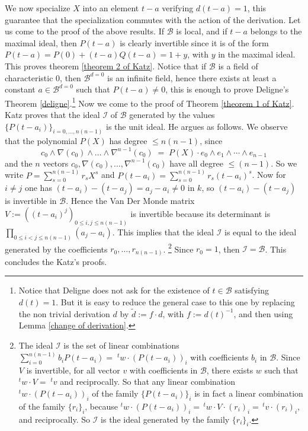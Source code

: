\documentclass{compositio}
\numberwithin{equation}{section}
\begin{document}
We now specialize $X$ into an element $t-a$ verifying $d(t-a)=1$, this guarantee that the 
specialization commutes with the action of the derivation. Let us come to the proof of the above results.
If ${\mathscr{B}}$ is local, and if $t-a$ belongs to the maximal ideal, 
then $P(t-a)$ is clearly invertible since it is of the form $P(t-a)=P(0)+(t-a)Q(t-a)=1+y$, 
with $y$ in the maximal ideal. 
\fi This proves theorem \ref{theorem 2 of Katz}. 
Notice that if ${\mathscr{B}}$ is a field of characteristic $0$, then ${\mathscr{B}}^{d=0}$ is an 
infinite field, hence there exists at least a constant $a\in{\mathscr{B}}^{d=0}$ such that $P(t-a)\neq 0$, 
this is enough to prove Deligne's Theorem \ref{deligne}.\footnote{Notice that Deligne does not ask for the existence of $t\in{\mathscr{B}}$ 
satisfying $d(t)=1$. But it is easy to reduce the general case to this one by replacing the non trivial 
derivation $d$ by $\widetilde{d}:=f\cdot d$, with $f:=d(t)^{-1}$, and then using Lemma \ref{change of derivation}.} 
Now we come to the proof of Theorem \ref{theorem 1 of Katz}. Katz proves that the ideal 
$\mathscr{I}$ 
of ${\mathscr{B}}$ generated by the values $\{P(t-a_i)\}_{i=0,\ldots,n(n-1)}$ is the unit ideal. He argues as follows. 
We observe that the polynomial $P(X)$ has degree $\leq n(n-1)$, since 
\begin{equation}
c_0\wedge\nabla(c_0)\wedge\ldots\wedge\nabla^{n-1}(c_0)\;=\;P(X)\cdot e_0\wedge e_1\wedge\cdots\wedge e_{n-1}
\end{equation}
and the $n$ vectors $c_0,\nabla(c_0),\ldots,\nabla^{n-1}(c_0)$ have all degree $\leq(n-1)$. So we write 
$P=\sum_{s=0}^{n(n-1)}r_sX^s$ and $P(t-a_i)=\sum_{s=0}^{n(n-1)}r_s(t-a_i)^s$. 
Now for $i\neq j$ one has $(t-a_i)-(t-a_j)=a_j-a_i\neq 0$ in $k$, 
so $(t-a_i)-(t-a_j)$ is invertible in ${\mathscr{B}}$. 
Hence the Van Der Monde matrix $V:=((t-a_i)^j)_{0\leq i,j\leq n(n-1)}$ is invertible 
because its determinant is $\prod_{0\leq i<j\leq n(n-1)}(a_j-a_i)$. This implies that the ideal $\mathscr{I}$ 
is equal to the ideal generated by the coefficients $r_0,\ldots,r_{n(n-1)}$.
\footnote{The ideal $\mathscr{I}$ is the set of linear combinations $\sum_{i=0}^{n(n-1)} 
b_iP(t-a_i)=\;^t\!w\cdot(P(t-a_i))_i$ with coefficients $b_i$ in ${\mathscr{B}}$. Since $V$ is invertible, 
for all vector $v$ with coefficients in ${\mathscr{B}}$, there exists $w$ such that $^tw\cdot V=\;^t\!v$ and reciprocally. 
So that any linear combination $^tw\cdot (P(t-a_i))_i$ of the family $\{P(t-a_i)\}_i$ is in fact a linear 
combination of the family $\{r_i\}_i$, because $^tw\cdot(P(t-a_i))_i=\,^t\!w\cdot V\cdot(r_i)_i=\,^t\!v\cdot(r_i)_i$, and reciprocally. So $\mathscr{I}$ is the 
ideal generated by the family $\{r_i\}_i$.} Since $r_0=1$, then $\mathscr{I}={\mathscr{B}}$. This concludes the Katz's proofs.
\end{document}
